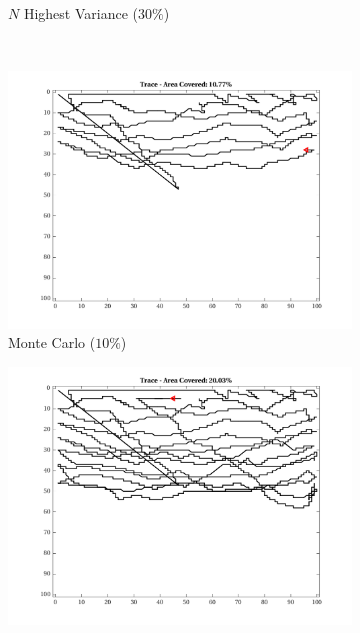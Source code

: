 \begin{figure}[htb!]
\begin{subfigure}[t]{0.32\textwidth}
        \caption{$N$ Highest Variance ($30\%$)}
    \end{subfigure}%
    \\
    \begin{subfigure}[t]{0.32\textwidth}
        \centering
        \includegraphics[width=\linewidth]{figures/hbresults/path_mc_10p_100x100_sf_1_seed_2.png}
        \ssp
        \captionsetup{skip=0.20\baselineskip,size=footnotesize}
        \caption{Monte Carlo ($10\%$)}
    \end{subfigure}%
    \begin{subfigure}[t]{0.32\textwidth}
        \centering
        \includegraphics[width=\linewidth]{figures/hbresults/path_mc_20p_100x100_sf_1_seed_2.png}
        \ssp

\end{subfigure}
\end{figure}
